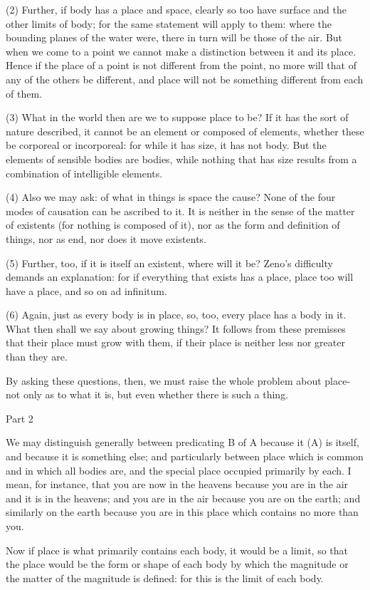 (2) Further, if body has a place and space, clearly so too have surface
and the other limits of body; for the same statement will apply to
them: where the bounding planes of the water were, there in turn will
be those of the air. But when we come to a point we cannot make a
distinction between it and its place. Hence if the place of a point
is not different from the point, no more will that of any of the others
be different, and place will not be something different from each
of them. 

(3) What in the world then are we to suppose place to be? If it has
the sort of nature described, it cannot be an element or composed
of elements, whether these be corporeal or incorporeal: for while
it has size, it has not body. But the elements of sensible bodies
are bodies, while nothing that has size results from a combination
of intelligible elements. 

(4) Also we may ask: of what in things is space the cause? None of
the four modes of causation can be ascribed to it. It is neither in
the sense of the matter of existents (for nothing is composed of it),
nor as the form and definition of things, nor as end, nor does it
move existents. 

(5) Further, too, if it is itself an existent, where will it be? Zeno's
difficulty demands an explanation: for if everything that exists has
a place, place too will have a place, and so on ad infinitum.

(6) Again, just as every body is in place, so, too, every place has
a body in it. What then shall we say about growing things? It follows
from these premisses that their place must grow with them, if their
place is neither less nor greater than they are. 

By asking these questions, then, we must raise the whole problem about
place-not only as to what it is, but even whether there is such a
thing. 

Part 2

We may distinguish generally between predicating B of A because it
(A) is itself, and because it is something else; and particularly
between place which is common and in which all bodies are, and the
special place occupied primarily by each. I mean, for instance, that
you are now in the heavens because you are in the air and it is in
the heavens; and you are in the air because you are on the earth;
and similarly on the earth because you are in this place which contains
no more than you. 

Now if place is what primarily contains each body, it would be a limit,
so that the place would be the form or shape of each body by which
the magnitude or the matter of the magnitude is defined: for this
is the limit of each body. 

